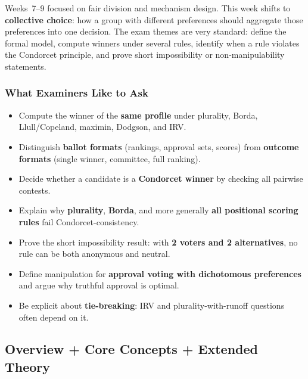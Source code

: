 Weeks~7--9 focused on fair division and mechanism design. This week shifts to \textbf{collective choice}: how a group with different preferences should aggregate those preferences into one decision. The exam themes are very standard: define the formal model, compute winners under several rules, identify when a rule violates the Condorcet principle, and prove short impossibility or non-manipulability statements.

\separator

\subsubsection*{What Examiners Like to Ask}

\begin{itemize}
  \item Compute the winner of the \textbf{same profile} under plurality, Borda, Llull/Copeland, maximin, Dodgson, and IRV.
  \item Distinguish \textbf{ballot formats} (rankings, approval sets, scores) from \textbf{outcome formats} (single winner, committee, full ranking).
  \item Decide whether a candidate is a \textbf{Condorcet winner} by checking all pairwise contests.
  \item Explain why \textbf{plurality}, \textbf{Borda}, and more generally \textbf{all positional scoring rules} fail Condorcet-consistency.
  \item Prove the short impossibility result: with \textbf{2 voters and 2 alternatives}, no rule can be both anonymous and neutral.
  \item Define manipulation for \textbf{approval voting with dichotomous preferences} and argue why truthful approval is optimal.
  \item Be explicit about \textbf{tie-breaking}: IRV and plurality-with-runoff questions often depend on it.
\end{itemize}

\separator

\subsection{Overview + Core Concepts + Extended Theory}

